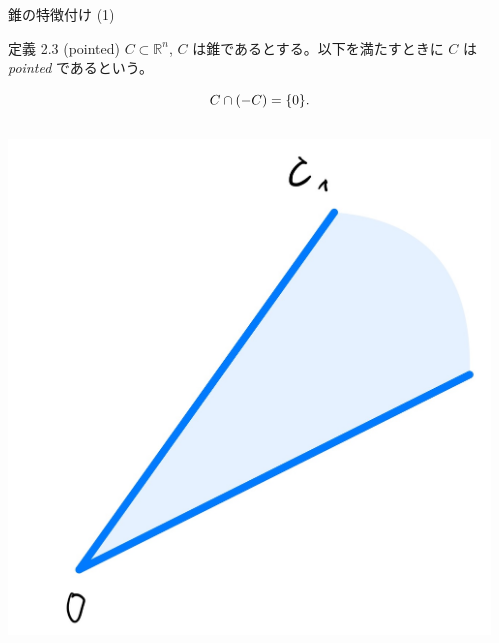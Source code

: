 \documentclass[aspectratio=169, dvipdfmx, 11pt]{beamer} %
\begin{document}
\begin{frame}{錐の特徴付け (1)}
  \begin{block}{定義 2.3 (pointed) }
    $C \subset \mathbb{R}^n$, $C$ は錐であるとする。以下を満たすときに $C$ は \textit{pointed} であるという。

    \begin{equation}
      C \cap  (-C) = \{0\}. \notag
    \end{equation}

  \end{block}

  \centering
  \begin{columns}
    \begin{column}{0.48\textwidth}
      \includegraphics[keepaspectratio, scale=0.08]{figures/cone_figure_1.jpg}
    \end{column}
    \begin{column}{0.48\textwidth}

\end{column}
\end{columns}
\end{frame}
\end{document}
